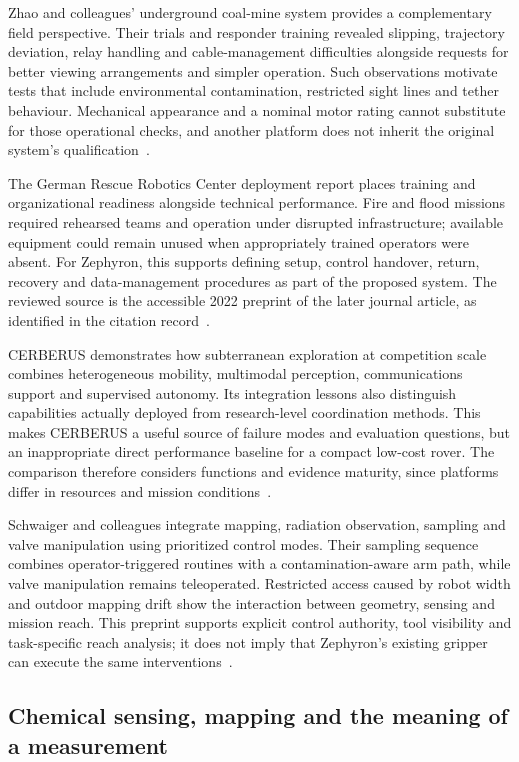 \documentclass[11pt,letterpaper]{article}
\begin{document}
Zhao and colleagues' underground coal-mine system provides a complementary field perspective. Their trials and responder training revealed slipping, trajectory deviation, relay handling and cable-management difficulties alongside requests for better viewing arrangements and simpler operation. Such observations motivate tests that include environmental contamination, restricted sight lines and tether behaviour. Mechanical appearance and a nominal motor rating cannot substitute for those operational checks, and another platform does not inherit the original system's qualification~\cite{LIT_COAL2017}.

The German Rescue Robotics Center deployment report places training and organizational readiness alongside technical performance. Fire and flood missions required rehearsed teams and operation under disrupted infrastructure; available equipment could remain unused when appropriately trained operators were absent. For Zephyron, this supports defining setup, control handover, return, recovery and data-management procedures as part of the proposed system. The reviewed source is the accessible 2022 preprint of the later journal article, as identified in the citation record~\cite{LIT_DRZ2024}.

CERBERUS demonstrates how subterranean exploration at competition scale combines heterogeneous mobility, multimodal perception, communications support and supervised autonomy. Its integration lessons also distinguish capabilities actually deployed from research-level coordination methods. This makes CERBERUS a useful source of failure modes and evaluation questions, but an inappropriate direct performance baseline for a compact low-cost rover. The comparison therefore considers functions and evidence maturity, since platforms differ in resources and mission conditions~\cite{LIT_CERBERUS2023}.

Schwaiger and colleagues integrate mapping, radiation observation, sampling and valve manipulation using prioritized control modes. Their sampling sequence combines operator-triggered routines with a contamination-aware arm path, while valve manipulation remains teleoperated. Restricted access caused by robot width and outdoor mapping drift show the interaction between geometry, sensing and mission reach. This preprint supports explicit control authority, tool visibility and task-specific reach analysis; it does not imply that Zephyron's existing gripper can execute the same interventions~\cite{LIT_SCHWAIGER2024}.

\subsection{Chemical sensing, mapping and the meaning of a measurement}
\end{document}
